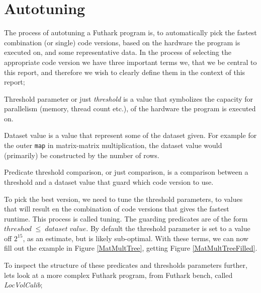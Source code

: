 \section{Autotuning}
The process of autotuning a Futhark program is, to automatically pick the fastest combination (or single) code versions, based on the hardware the program is executed on, and some representative data. In the process of selecting the appropriate code version we have three important terms we, that we be central to this report, and therefore we wish to clearly define them in the context of this report;
\begin{basedescript}{
		\desclabelstyle{\multilinelabel}
		\desclabelwidth{2cm}}
	\item [Threshold parameter] or just \textit{threshold} is a value that symbolizes the capacity for parallelism (memory, thread count etc.), of the hardware the program is executed on. 
	\item [Dataset value] is a value that represent some of the dataset given. For example for the outer \texttt{map} in matrix-matrix multiplication, the dataset value would (primarily) be constructed by the number of rows.
	\item [Predicate] threshold comparison, or just comparison, is a comparison between a threshold and a dataset value that guard which code version to use.   
\end{basedescript}
To pick the best version, we need to tune the threshold parameters, to values that will result en the combination of code versions that gives the fastest runtime. This process is called tuning. The guarding predicates are of the form $threshod \; \leq \; dataset\; value$. By default the threshold parameter is set to a value off $2^{15}$, as an estimate, but is likely sub-optimal. With these terms, we can now fill out the example in Figure \ref{MatMultTree}, getting Figure \ref{MatMultTreeFilled}. 
\begin{center}
	\centering 
	
	\label{MatMultTreeFilled}
\end{center}
To inspect the structure of these predicates and thresholds parameters further, lets look at a more complex Futhark program, from Futhark bench, called \textit{LocVolCalib};
\begin{center}
	\centering
	
	\label{LocVolCalibTree}
\end{center}
